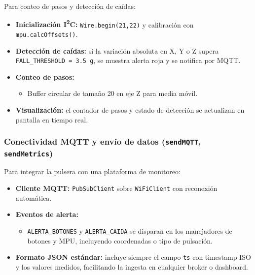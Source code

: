 \documentclass[12pt, a4paper]{article}
\begin{document}
	Para conteo de pasos y detección de caídas:
	\begin{itemize}
	\item \textbf{Inicialización I\textsuperscript{2}C:} \texttt{Wire.begin(21,22)} y calibración con \texttt{mpu.calcOffsets()}.  
	\item \textbf{Detección de caídas:} si la variación absoluta en X, Y o Z supera \texttt{FALL\_THRESHOLD = 3.5\,g}, se muestra alerta roja y se notifica por MQTT.  
	\item \textbf{Conteo de pasos:}
	\begin{itemize}
		\item Buffer circular de tamaño 20 en eje Z para media móvil.  
	\end{itemize}
	\item \textbf{Visualización:} el contador de pasos y estado de detección se actualizan en pantalla en tiempo real.
	\end{itemize}
	
	
	\subsubsection{Conectividad MQTT y envío de datos (\texttt{sendMQTT}, \texttt{sendMetrics})}
	
	Para integrar la pulsera con una plataforma de monitoreo:
	\begin{itemize}
	\item \textbf{Cliente MQTT:} \texttt{PubSubClient} sobre \texttt{WiFiClient} con reconexión automática.  
	\item \textbf{Eventos de alerta:} 
	\begin{itemize}
		\item \texttt{ALERTA\_BOTONES} y \texttt{ALERTA\_CAIDA} se disparan en los manejadores de botones y MPU, incluyendo coordenadas o tipo de pulsación.  
	\end{itemize}
	\item \textbf{Formato JSON estándar:} incluye siempre el campo \texttt{ts} con timestamp ISO y los valores medidos, facilitando la ingesta en cualquier broker o dashboard.
	\end{itemize}
	
\end{document}
